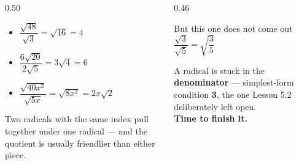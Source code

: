 \documentclass[aspectratio=169, 11pt]{beamer}
\begin{document}
\begin{frame}[t, plain]
  \begin{columns}[T]
    \begin{column}{0.50\textwidth}
      \footnotesize
      \begin{itemize}\setlength{\itemsep}{7pt}
        \item $\dfrac{\sqrt{48}}{\sqrt3}=\sqrt{16}=4$
        \item $\dfrac{6\sqrt{20}}{2\sqrt5}=3\sqrt4=6$
        \item $\dfrac{\sqrt{40x^{3}}}{\sqrt{5x}}=\sqrt{8x^{2}}=2x\sqrt2$
      \end{itemize}
      \vspace{6pt}
      {\footnotesize Two radicals with the same index pull together under one radical --- and the
      quotient is usually friendlier than either piece.}
    \end{column}
    \begin{column}{0.46\textwidth}
      \begin{block}{But this one does not come out}
        \centering $\dfrac{\sqrt3}{\sqrt5}=\sqrt{\dfrac{3}{5}}$
      \end{block}
      \vspace{4pt}
      {\footnotesize A radical is stuck in the \textbf{denominator} --- simplest-form condition
      \textbf{3}, the one Lesson 5.2 deliberately left open. \\[5pt]
      \textcolor{goldacc}{\textbf{Time to finish it.}}}
    \end{column}
  \end{columns}
\end{frame}
\end{document}
